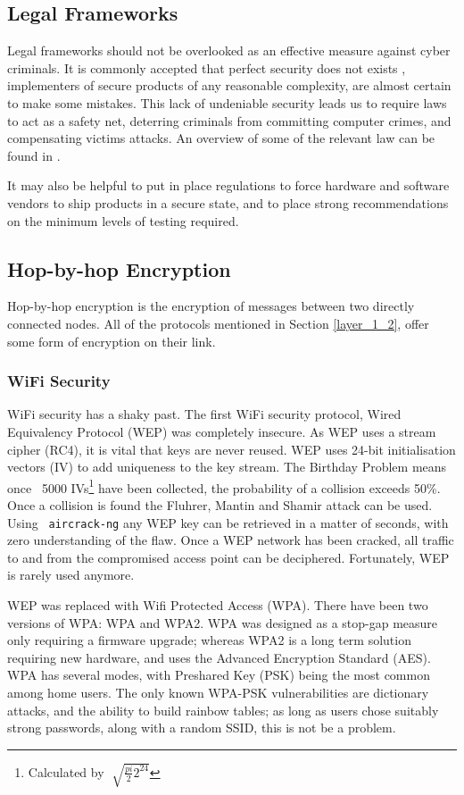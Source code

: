 \documentclass[10pt,journal,compsoc]{IEEEtran}
\begin{document}
\subsection{Legal Frameworks}
Legal frameworks should not be overlooked as an effective measure against cyber
criminals. It is commonly accepted that perfect security does not exists
\cite{ThereMustBeA}, implementers of secure products of any reasonable
complexity, are almost certain to make some mistakes. This lack of undeniable
security leads us to require laws to act as a safety net, deterring criminals
from committing computer crimes, and compensating victims attacks. An overview
of some of the relevant law can be found in \cite{Weber2010}. 

It may also be helpful to put in place regulations to force hardware and
software vendors to ship products in a secure state, and to place
strong recommendations on the minimum levels of testing required. 

\subsection{Hop-by-hop Encryption}
Hop-by-hop encryption is the encryption of messages between two directly
connected nodes. All of the  protocols mentioned in Section \ref{layer_1_2},
offer some form of encryption on their link. 

\subsubsection{WiFi Security}
WiFi security has a shaky past. The first WiFi security protocol, Wired
Equivalency Protocol (WEP) was completely insecure. As WEP uses a stream cipher
(RC4), it is vital that keys are never reused. WEP uses 24-bit initialisation
vectors (IV) to add uniqueness to the key stream. The Birthday Problem means
once ~5000 IVs\footnote{Calculated by $\sqrt[]{\frac{pi}{2} 2^{24}} $} have
been collected, the probability of a collision exceeds 50\%.  Once a collision
is found the Fluhrer, Mantin and Shamir attack can be used.  Using {\tt
aircrack-ng} any WEP key can be retrieved in a matter of seconds, with zero
understanding of the flaw. Once a WEP network has been cracked, all traffic to
and from the compromised access point can be deciphered.  Fortunately, WEP is
rarely used anymore.

WEP was replaced with Wifi Protected Access (WPA). There have been two versions
of WPA: WPA and WPA2. WPA was designed as a stop-gap measure only requiring a
firmware upgrade; whereas WPA2 is a long term solution requiring new hardware,
and uses the Advanced Encryption Standard (AES). WPA has several modes, with
Preshared Key (PSK) being the most common among home users. The only known
WPA-PSK vulnerabilities are dictionary attacks, and the ability to build
rainbow tables; as long as users chose suitably strong passwords, along with a
random SSID, this is not be a problem. 
\end{document}
